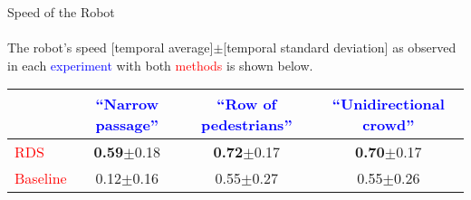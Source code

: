 \documentclass{article}
\begin{document}
{\centering\Large Speed of the Robot\\}~\\
The robot's speed [temporal average]$\pm$[temporal standard deviation] as observed in each \textcolor{blue}{experiment} with both \textcolor{red}{methods} is shown below.
\begin{table}[h]
	\centering
	\begin{tabular}{|l|c|c|c|}
		\hline
		  & \textcolor{blue}{``Narrow passage''}              & \textcolor{blue}{``Row of pedestrians''} & \textcolor{blue}{``Unidirectional crowd''}\\
		\hline
		\textcolor{red}{RDS}      & \textbf{0.59}$\pm$0.18 & \textbf{0.72}$\pm$0.17 & \textbf{0.70}$\pm$0.17\\
		\hline
		\textcolor{red}{Baseline} & 0.12$\pm$0.16          & 0.55$\pm$0.27          & 0.55$\pm$0.26         \\
		\hline
	\end{tabular}
\end{table}
\end{document}
